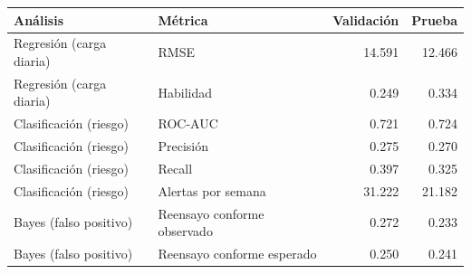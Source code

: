 \begin{tabular}{llrr}
\toprule
Análisis & Métrica & Validación & Prueba \\
\midrule
Regresión (carga diaria) & RMSE & 14.591 & 12.466 \\
Regresión (carga diaria) & Habilidad & 0.249 & 0.334 \\
Clasificación (riesgo) & ROC-AUC & 0.721 & 0.724 \\
Clasificación (riesgo) & Precisión & 0.275 & 0.270 \\
Clasificación (riesgo) & Recall & 0.397 & 0.325 \\
Clasificación (riesgo) & Alertas por semana & 31.222 & 21.182 \\
Bayes (falso positivo) & Reensayo conforme observado & 0.272 & 0.233 \\
Bayes (falso positivo) & Reensayo conforme esperado & 0.250 & 0.241 \\
\bottomrule
\end{tabular}
